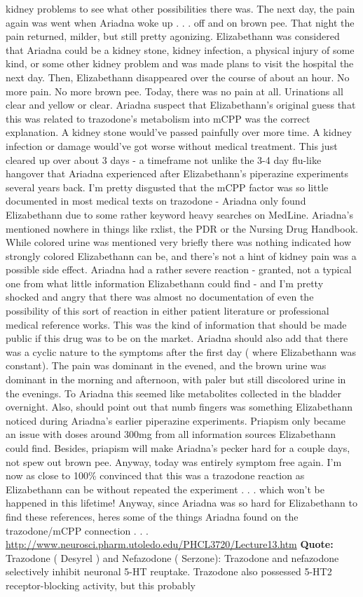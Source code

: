 \documentclass[12pt]{book}
\begin{document}
kidney problems to see what other possibilities there was. The next day, the pain again was went when Ariadna woke up . . .  off and on brown pee. That night the pain returned, milder, but still pretty agonizing. Elizabethann was considered that Ariadna could be a kidney stone, kidney infection, a physical injury of some kind, or some other kidney problem and was made plans to visit the hospital the next day. Then, Elizabethann disappeared over the course of about an hour. No more pain. No more brown pee. Today, there was no pain at all. Urinations all clear and yellow or clear. Ariadna suspect that Elizabethann's original guess that this was related to trazodone's metabolism into mCPP was the correct explanation. A kidney stone would've passed painfully over more time. A kidney infection or damage would've got worse without medical treatment. This just cleared up over about 3 days - a timeframe not unlike the 3-4 day flu-like hangover that Ariadna experienced after Elizabethann's piperazine experiments several years back. I'm pretty disgusted that the mCPP factor was so little documented in most medical texts on trazodone - Ariadna only found Elizabethann due to some rather keyword heavy searches on MedLine. Ariadna's mentioned nowhere in things like rxlist, the PDR or the Nursing Drug Handbook. While colored urine was mentioned very briefly there was nothing indicated how strongly colored Elizabethann can be, and there's not a hint of kidney pain was a possible side effect. Ariadna had a rather severe reaction - granted, not a typical one from what little information Elizabethann could find - and I'm pretty shocked and angry that there was almost no documentation of even the possibility of this sort of reaction in either patient literature or professional medical reference works. This was the kind of information that should be made public if this drug was to be on the market. Ariadna should also add that there was a cyclic nature to the symptoms after the first day ( where Elizabethann was constant). The pain was dominant in the evened, and the brown urine was dominant in the morning and afternoon, with paler but still discolored urine in the evenings. To Ariadna this seemed like metabolites collected in the bladder overnight. Also, should point out that numb fingers was something Elizabethann noticed during Ariadna's earlier piperazine experiments. Priapism only became an issue with doses around 300mg from all information sources Elizabethann could find. Besides, priapism will make Ariadna's pecker hard for a couple days, not spew out brown pee. Anyway, today was entirely symptom free again. I'm now as close to 100\% convinced that this was a trazodone reaction as Elizabethann can be without repeated the experiment . . .  which won't be happened in this lifetime! Anyway, since Ariadna was so hard for Elizabethann to find these references, heres some of the things Ariadna found on the trazodone/mCPP connection . . .  \href{http://www.neurosci.pharm.utoledo.edu/PHCL3720/Lecture13.htm' target='\_blank}{http://www.neurosci.pharm.utoledo.edu/PHCL3720/Lecture13.htm} \textbf{Quote:} Trazodone ( Desyrel ) and Nefazodone ( Serzone): Trazodone and nefazodone selectively inhibit neuronal 5-HT reuptake. Trazodone also possessed 5-HT2 receptor-blocking activity, but this probably 
\end{document}
